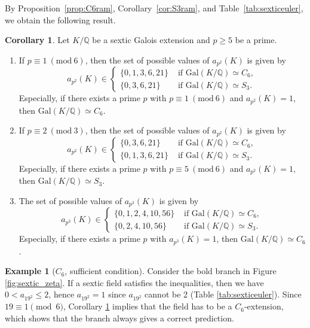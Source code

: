 \documentclass[letterpaper, 10pt]{article}
\newcommand{\Gal}{\mathrm{Gal}}
\newcommand{\Mod}[1]{\ (\mathrm{mod}\ #1)}
\newcommand{\bQ}{\mathbb{Q}}
\newcommand{\1}{\mathds{1}}	%
\theoremstyle{definition}
\newtheorem{corollary}[theorem]{Corollary}
\newtheorem{example}[theorem]{Example}
\theoremstyle{remark}
\begin{document}
By Proposition~\ref{prop:C6ram}, Corollary~\ref{cor:S3ram}, and Table~\ref{tab:sexticeuler}, we obtain the following result.
\begin{corollary}
    \label{cor:sextic_zc}
    Let $K / \bQ$ be a sextic Galois extension and $p \ge 5$ be a prime.
    \begin{enumerate}
        \item If $p \equiv 1 \Mod{6}$, then the set of possible values of $a_{p^2}(K)$ is given by 
        \begin{equation}
            a_{p^2}(K) \in \begin{cases} \{0, 1, 3, 6, 21\} & \text{ if } \Gal(K/\bQ) \simeq C_6,  \\ \{0, 3, 6, 21\} & \text{ if } \Gal(K / \bQ) \simeq S_3. \end{cases}
        \end{equation}
        Especially, if there exists a prime $p$ with $p \equiv 1 \Mod{6}$ and $a_{p^2}(K) = 1$, then $\Gal(K / \bQ) \simeq C_6$.
        \item If $p \equiv 2 \Mod{3}$, then the set of possible values of $a_{p^2}(K)$ is given by
        \begin{equation}
            a_{p^2}(K) \in \begin{cases} \{0, 3, 6, 21\} & \text{ if }  \Gal(K/\bQ) \simeq C_6,\\ \{0, 1, 3, 6, 21\} & \text{ if } \Gal(K / \bQ) \simeq S_3. \end{cases}
        \end{equation}
        Especially, if there exists a prime $p$ with $p \equiv 5 \Mod{6}$ and $a_{p^2}(K) = 1$, then $\Gal(K / \bQ) \simeq S_3$.
        \item The set of possible values of $a_{p^3}(K)$ is given by
        \begin{equation}
            a_{p^3}(K) \in \begin{cases}
                \{0, 1, 2, 4, 10, 56\} & \text{ if } \Gal(K / \bQ) \simeq C_6,\\
                \{0, 2, 4, 10, 56\} & \text{ if }  \Gal(K / \bQ) \simeq S_3.
            \end{cases}
        \end{equation}
        Especially, if there exists a prime $p$ with $a_{p^3}(K) = 1$, then $\Gal(K / \bQ) \simeq C_6$.
    \end{enumerate}
\end{corollary}


\begin{example}[$C_6$, sufficient condition]
\label{ex:sextic_zeta_branch}
    Consider the bold branch in Figure \ref{fig:sextic_zeta}.
    If a sextic field satisfies the inequalities, then we have $ 0 < a_{19^2} \le  2$, hence $a_{19^2} = 1$  since $a_{19^2}$ cannot be 2 (Table \ref{tab:sexticeuler}).
    Since $19 \equiv 1 \pmod{6}$, Corollary \ref{cor:sextic_zc} implies that the field has to be a $C_6$-extension, which shows that the branch always gives a correct prediction.
\end{example}
\end{document}
